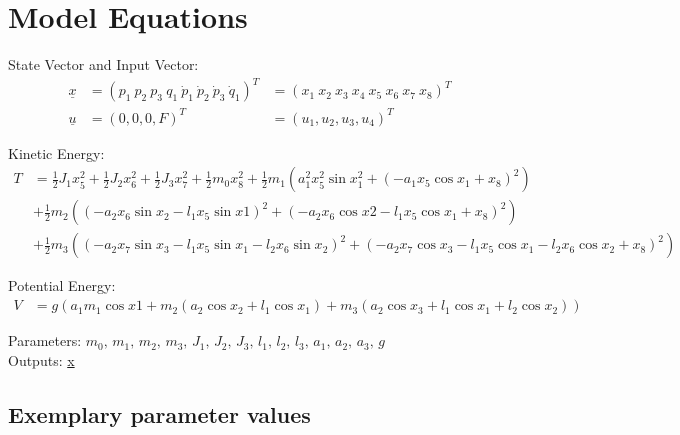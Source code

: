 \documentclass[10pt,a4paper]{article}
\begin{document}
	
	
	\section{Model Equations} %
	
	State Vector and Input Vector:
	\begin{align*}
		\underline{x} &= (p_1 \ p_2 \ p_3 \ q_1 \ \dot{p}_1 \ \dot{p}_2 \ \dot{p}_3 \ \dot{q}_1)^T &= (x_1 \ x_2 \ x_3 \ x_4 \ x_5 \ x_6 \ x_7 \ x_8)^T \\
		\underline{u} &= (0, 0, 0, F)^T &= (u_1, u_2, u_3, u_4)^T
	\end{align*}
	
	\noindent Kinetic Energy:			
	\begin{subequations}
	\begin{align*}
		T &= \frac{1}{2}J_1x_5^2 + \frac{1}{2}J_2x_6^2 + \frac{1}{2}J_3x_7^2 + \frac{1}{2}m_0x_8^2 + \frac{1}{2}m_1(a_1^2x_5^2\sin x_1^2 + (-a_1x_5 \cos x_1 + x_8)^2) \\
		& + \frac{1}{2}m_2((-a_2x_6 \sin x_2 - l_1x_5 \sin x1 )^2 + (-a_2x_6 \cos x2 - l_1x_5 \cos x_1 + x_8)^2) \\
		& + \frac{1}{2}m_3((-a_2x_7 \sin x_3 - l_1x_5 \sin x_1 - l_2x_6 \sin x_2)^2 + (-a_2x_7 \cos x_3 - l_1x_5 \cos x_1 - l_2x_6 \cos x_2 + x_8)^2)
	\end{align*}
	\end{subequations}
	
	\noindent Potential Energy:			
	\begin{subequations}
	\begin{align*}
		V &= g(a_1m_1 \cos x1 + m_2(a_2 \cos x_2 + l_1 \cos x_1) + m_3(a_2 \cos x_3 + l_1 \cos x_1 + l_2 \cos x_2))
	\end{align*}
	\end{subequations}

	\noindent
	Parameters: $m_0, \, m_1, \, m_2, \, m_3, \, J_1, \, J_2, \, J_3, \, l_1, \, l_2, \, l_3, \, a_1, \, a_2, \, a_3, \, g$ %
	\\
	Outputs: \underline{x}
	
	
	
	\subsection{Exemplary parameter values}
	
\end{document}
